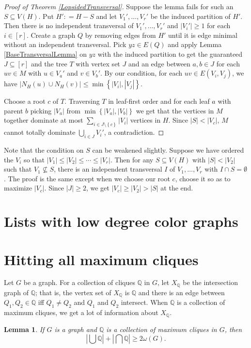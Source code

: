 \documentclass[openany]{tufte-book} %
\theoremstyle{plain}
\newtheorem{lemma}{Lemma}
\newcommand{\set}[1]{\left\{ #1 \right\}}
\newcommand{\card}[1]{\left|#1\right|}
\newcommand{\irange}[1]{\left[#1\right]}
\newcommand{\DefinedAs}{\mathrel{\mathop:}=}
\newcommand{\Q}{\mathbb{Q}}
\begin{document}
\begin{proof}[Proof of Theorem \ref{LopsidedTransversal}]
Suppose the lemma fails for such an $S \subseteq V(H)$.  Put $H' \DefinedAs H - S$ and let $V_1', \ldots, V_r'$ be the induced partition of $H'$. Then there is no independent transversal of $V_1', \ldots, V_r'$ and $\card{V_i'} \geq 1$ for each $i \in \irange{r}$. Create a graph $Q$ by removing edges from $H'$ until it is edge minimal without an independent transversal. Pick $yz \in E(Q)$ and apply Lemma 
\ref{BaseTransversalLemma} on $yz$ with the induced partition to get the guaranteed 
$J \subseteq \irange{r}$ and the tree $T$ with vertex set $J$ and an edge between $a, b \in
J$ for each $uv \in M$ with $u \in V_a'$ and $v \in V_b'$.  By our condition, for each $uv \in E(V_i, V_j)$, we have $\card{N_H(u) \cup N_H(v)} \leq \min\set{\card{V_i}, \card{V_j}}$.

Choose a root $c$ of $T$. Traversing $T$ in leaf-first order and for each leaf $a$ with parent $b$ picking $|V_a|$ from $\min\set{|V_a|, |V_b|}$ we get that the vertices in $M$ together dominate at most $\sum_{i \in J \setminus \set{c}} \card{V_i}$ vertices in $H$.  Since $\card{S} < \card{V_c}$, $M$ cannot totally dominate $\bigcup_{i \in J} V_i'$, a contradiction.
\end{proof}

Note that the condition on $S$ can be weakened slightly.  Suppose we have ordered the $V_i$ so that $\card{V_1} \leq \card{V_2} \leq \cdots \leq \card{V_r}$.  Then for any $S \subseteq V(H)$ with $\card{S} < \card{V_2}$ such that $V_1 \not \subseteq S$, there is an independent transversal $I$ of $V_1, \ldots, V_r$ with $I \cap S = \emptyset$.  The proof is the same except when we choose our root $c$, choose it so as to maximize $\card{V_c}$.  
Since $\card{J} \geq 2$, we get $\card{V_c} \geq \card{V_2} > \card{S}$ at the end.
\section{Lists with low degree color graphs}

\section{Hitting all maximum cliques}
Let $G$ be a graph. For a collection of cliques $\Q$ in $G$, let $X_\Q$ be the intersection graph of $\Q$; that is, the 
vertex set of $X_\Q$ is $\Q$ and there is an edge between $Q_1, Q_2 \in \Q$ iff $Q_1 \ne Q_2$ and $Q_1$ and $Q_2$ intersect.
When $\Q$ is a collection of maximum cliques, we get a lot of information about $X_\Q$.  
\begin{lemma}\label{HajnalLemma}
If $G$ is a graph and $\Q$ is a collection of maximum cliques in $G$, then 
\[\card{\bigcup \Q} + \card{\bigcap \Q} \geq 2\omega(G).\]
\end{lemma}
\end{document}
